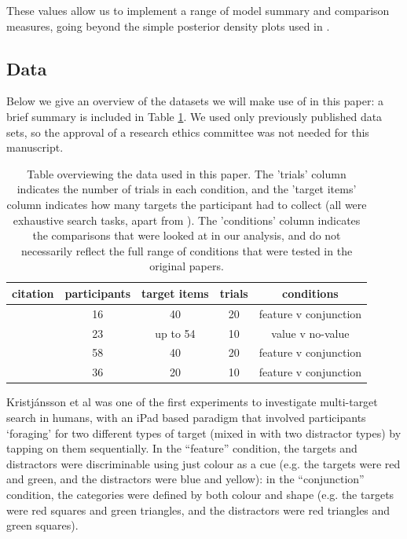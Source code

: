 \documentclass[man, floatsintext]{apa7}
\begin{document}
These values allow us to implement a range of model summary and comparison measures, going beyond the simple posterior density plots used in \cite{clarke2022foraging}.

\subsection{Data}

Below we give an overview of the datasets we will make use of in this paper: a brief summary is included in Table \ref{tab:data}. We used only previously published data sets, so the approval of a research ethics committee was not needed for this manuscript.

\begin{table}[bp]
\centering
\begin{tabular}{r|cccc}
citation  & participants & target items  & trials & conditions  \\
 \hline
 \cite{kristjansson2014}  & 16 & 40 & 20 & feature v conjunction   \\
  \cite{tagu2022selection} & 23 & up to 54 & 10 & value v no-value \\
  \cite{clarke2022qjep} & 58 & 40 & 20 & feature v conjunction \\
    \cite{hughes2024} & 36 & 20 & 10 & feature v conjunction \\
\end{tabular}
\caption{Table overviewing the data used in this paper. The 'trials' column indicates the number of trials in each condition, and the 'target items' column indicates how many targets the participant had to collect (all were exhaustive search tasks, apart from \cite{tagu2022selection}). The 'conditions' column indicates the comparisons that were looked at in our analysis, and do not necessarily reflect the full range of conditions that were tested in the original papers.} 
\label{tab:data}
\end{table}

Kristj{\'a}nsson et al \cite{kristjansson2014} was one of the first experiments to investigate multi-target search in humans, with an iPad based paradigm that involved participants ‘foraging’ for two different types of target (mixed in with two distractor types) by tapping on them sequentially. In the “feature”
condition, the targets and distractors were discriminable using just colour as a cue (e.g. the targets were red and green, and the distractors were blue and yellow): in the “conjunction” condition, the categories were defined by both colour and shape (e.g. the targets were red squares and green triangles, and the distractors were red triangles and green squares).
\end{document}
